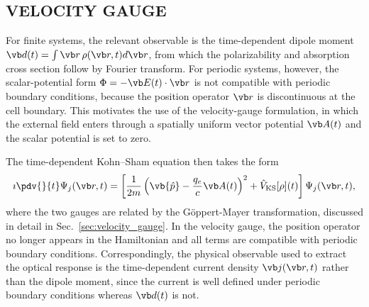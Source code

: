 \subsection{ VELOCITY GAUGE}


For finite systems, the relevant observable is the
time-dependent dipole moment $\vb d(t) = \int \vb r\,
\rho(\vb r,t) d\vb r$, from which the polarizability
and absorption cross section follow by Fourier transform.
For periodic systems, however, the scalar-potential form
$\Phi = -\vb E(t)\cdot\vb r$ is not compatible with
periodic boundary conditions, because the position
operator $\vb r$ is discontinuous at the cell boundary.
This motivates the use of the velocity-gauge formulation,
in which the external field enters through a spatially
uniform vector potential $\vb A(t)$ and the scalar
potential is set to zero.

The time-dependent Kohn--Sham equation then takes the form
\begin{equation}
  \imath \pdv{}{t} \Psi_j(\vb r,t) = \left[
    \frac{1}{2m}\left(\vb{\hat p}
    - \frac{q_e}{c}\vb A(t)\right)^2
    + \hat V_{\mathrm{KS}}[\rho](t)
  \right] \Psi_j(\vb r,t),
  \label{eq:tdks_velocity_gauge}
\end{equation}
where the two gauges are related by the Göppert-Mayer
transformation, discussed in detail in
Sec.~\ref{sec:velocity_gauge}.
In the velocity gauge, the position operator no longer
appears in the Hamiltonian and all terms are compatible
with periodic boundary conditions.
Correspondingly, the physical observable used to extract
the optical response is the time-dependent current density
$\vb j(\vb r,t)$ rather than the dipole moment, since
the current is well defined under periodic boundary
conditions whereas $\vb d(t)$ is not.





